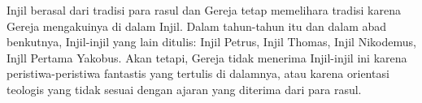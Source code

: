 Injil berasal dari tradisi para rasul dan Gereja tetap memelihara tradisi karena Gereja mengakuinya di dalam Injil. Dalam tahun-tahun itu dan dalam abad benkutnya, Injil-injil yang lain ditulis: Injil Petrus, Injil Thomas, Injil Nikodemus, Injll Pertama Yakobus. Akan tetapi, Gereja tidak menerima Injil-injil ini karena peristiwa-peristiwa fantastis yang tertulis di dalamnya, atau karena orientasi teologis yang tidak sesuai dengan ajaran yang diterima dari para rasul. 